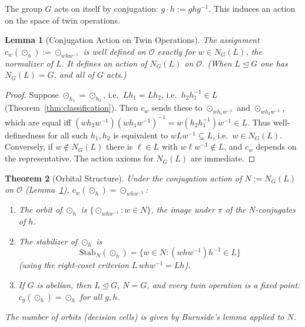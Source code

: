 \documentclass[11pt,a4paper,openany]{book}
\theoremstyle{plain}
\newtheorem{theorem}{Theorem}[chapter]
\newtheorem{lemma}[theorem]{Lemma}
\theoremstyle{definition}
\newcommand{\twing}[1]{\odot_{#1}}
\newcommand{\opspace}{\mathcal{O}}
\newcommand{\lingroup}{L}
\newcommand{\groupG}{G}
\begin{document}
The group $\groupG$ acts on itself by conjugation: $g \cdot h := ghg^{-1}$. This induces an action on the space of twin operations.

\begin{lemma}[Conjugation Action on Twin Operations]\label{lem:conjugation}
The assignment $c_w(\twing{h}) := \twing{whw^{-1}}$ is well defined on $\opspace$ \emph{exactly} for $w \in N_{\groupG}(\lingroup)$, the normalizer of $\lingroup$. It defines an action of $N_{\groupG}(\lingroup)$ on $\opspace$. (When $\lingroup\trianglelefteq\groupG$ one has $N_{\groupG}(\lingroup)=\groupG$, and all of $\groupG$ acts.)
\end{lemma}

\begin{proof}
Suppose $\twing{h_1} = \twing{h_2}$, i.e.\ $\lingroup h_1=\lingroup h_2$, i.e.\ $h_2h_1^{-1}\in\lingroup$ (Theorem~\ref{thm:classification}). Then $c_w$ sends these to $\twing{wh_1w^{-1}}$ and $\twing{wh_2w^{-1}}$, which are equal iff $(wh_2w^{-1})(wh_1w^{-1})^{-1}=w(h_2h_1^{-1})w^{-1}\in\lingroup$. Thus well-definedness for all such $h_1,h_2$ is equivalent to $w\lingroup w^{-1}\subseteq\lingroup$, i.e.\ $w\in N_{\groupG}(\lingroup)$. Conversely, if $w\notin N_{\groupG}(\lingroup)$ there is $\ell\in\lingroup$ with $w\ell w^{-1}\notin\lingroup$, and $c_w$ depends on the representative. The action axioms for $N_{\groupG}(\lingroup)$ are immediate.
\end{proof}

\begin{theorem}[Orbital Structure]\label{thm:orbital}
Under the conjugation action of $N:=N_{\groupG}(\lingroup)$ on $\opspace$ (Lemma~\ref{lem:conjugation}), $c_w(\twing{h}) = \twing{whw^{-1}}$:
\begin{enumerate}
    \item The orbit of $\twing{h}$ is $\{\twing{whw^{-1}} : w \in N\}$, the image under $\pi$ of the $N$-conjugates of $h$.
    
    \item The stabilizer of $\twing{h}$ is
    \[
    \mathrm{Stab}_N(\twing{h}) = \{w \in N : (whw^{-1})h^{-1} \in \lingroup\}
    \]
    (using the right-coset criterion $\lingroup\,whw^{-1}=\lingroup h$).
    
    \item If $\groupG$ is abelian, then $\lingroup\trianglelefteq\groupG$, $N=\groupG$, and every twin operation is a fixed point: $c_g(\twing{h}) = \twing{h}$ for all $g,h$.
\end{enumerate}
The number of orbits (decision cells) is given by Burnside's lemma applied to $N$.
\end{theorem}
\end{document}
